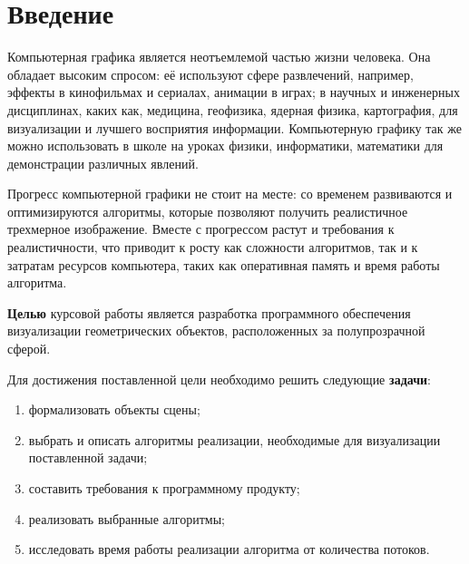 \section*{Введение}
{}
Компьютерная графика является неотъемлемой частью жизни человека. Она обладает высоким спросом: её используют сфере развлечений, например, эффекты в кинофильмах и сериалах, анимации в играх; в научных и инженерных дисциплинах, каких как, медицина, геофизика, ядерная физика, картография, для визуализации и лучшего восприятия информации. Компьютерную графику так же можно использовать в школе на уроках физики, информатики, математики для демонстрации различных явлений.

Прогресс компьютерной графики не стоит на месте: со временем развиваются и оптимизируются алгоритмы, которые позволяют получить реалистичное трехмерное изображение. Вместе с прогрессом растут и требования к реалистичности, что приводит к росту как сложности алгоритмов, так и к затратам ресурсов компьютера, таких как оперативная память и время работы алгоритма. 

\textbf{Целью} курсовой работы является разработка программного обеспечения визуализации геометрических объектов, расположенных за полупрозрачной сферой. 


Для достижения поставленной цели необходимо решить следующие \textbf{задачи}:
\begin{enumerate}
	\item формализовать объекты сцены;
	\item выбрать и описать алгоритмы реализации, необходимые для визуализации поставленной задачи;
	\item составить требования к программному продукту;
	\item реализовать выбранные алгоритмы;
	\item исследовать время работы реализации алгоритма от количества потоков.
\end{enumerate}


\newpage